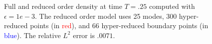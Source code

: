 \documentclass[preprint,10pt]{elsarticle}
\theoremstyle{definition}
\theoremstyle{lemma}
\theoremstyle{theorem}
\theoremstyle{assumption}
\newcommand{\note}[1]{{\color{blue}{#1}}}
\newcommand{\bnote}[1]{{\color{blue}{#1}}}
\begin{document}
\begin{figure}
\caption{Full and reduced order density at time $T = .25$ computed with $\epsilon = 1e-3$.  The reduced order model uses 25 modes, 300 hyper-reduced points (in \textcolor{red}{red}), and 66 hyper-reduced boundary points (in \textcolor{blue}{blue}).  The relative $L^2$ error is $.0071$.}
\label{fig:pulse2d}
\end{figure}



\subsection{\bnote{On computational performance}}
\end{document}
